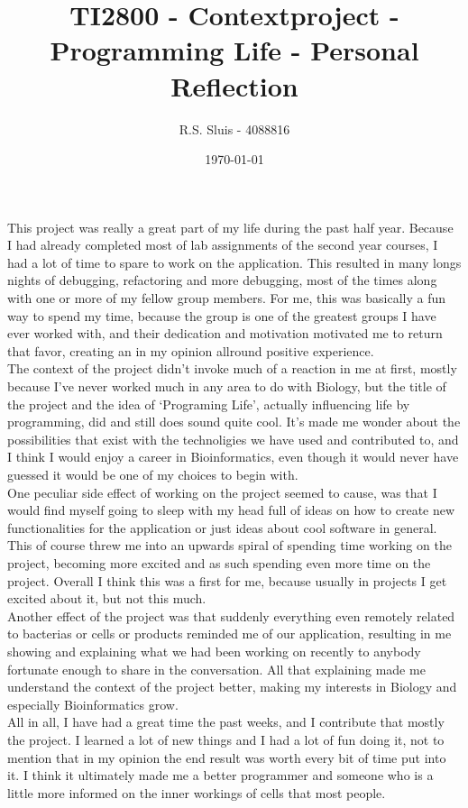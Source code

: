 \documentclass{article}
\title{TI2800 - Contextproject - Programming Life - Personal Reflection}
\author{R.S. Sluis - 4088816}
\date{\today}
\begin{document}
	\maketitle
	This project was really a great part of my life during the past half year. Because I had already completed most of lab assignments of the second year courses, I had a lot of time to spare to work on the application. This resulted in many longs nights of debugging, refactoring and more debugging, most of the times along with one or more of my fellow group members. For me, this was basically a fun way to spend my time, because the group is one of the greatest groups I have ever worked with, and their dedication and motivation motivated me to return that favor, creating an in my opinion allround positive experience.\\
	The context of the project didn't invoke much of a reaction in me at first, mostly because I've never worked much in any area to do with Biology, but the title of the project and the idea of `Programing Life', actually influencing life by programming, did and still does sound quite cool. It's made me wonder about the possibilities that exist with the technoligies we have used and contributed to, and I think I would enjoy a career in Bioinformatics, even though it would never have guessed it would be one of my choices to begin with.\\
	One peculiar side effect of working on the project seemed to cause, was that I would find myself going to sleep with my head full of ideas on how to create new functionalities for the application or just ideas about cool software in general. This of course threw me into an upwards spiral of spending time working on the project, becoming more excited and as such spending even more time on the project. Overall I think this was a first for me, because usually in projects I get excited about it, but not this much.\\
	Another effect of the project was that suddenly everything even remotely related to bacterias or cells or products reminded me of our application, resulting in me showing and explaining what we had been working on recently to anybody fortunate enough to share in the conversation. All that explaining made me understand the context of the project better, making my interests in Biology and especially Bioinformatics grow.\\
	All in all, I have had a great time the past weeks, and I contribute that mostly the project. I learned a lot of new things and I had a lot of fun doing it, not to mention that in my opinion the end result was worth every bit of time put into it. I think it ultimately made me a better programmer and someone who is a little more informed on the inner workings of cells that most people.
\end{document}
